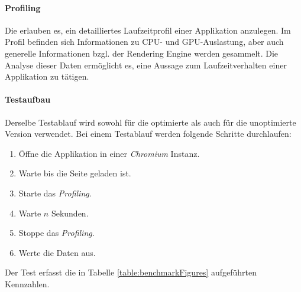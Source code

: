 \paragraph{Profiling}
Die  erlauben es, ein detailliertes Laufzeitprofil einer Applikation anzulegen.
Im Profil befinden sich Informationen zu CPU- und GPU-Auslastung, aber auch generelle Informationen bzgl. der \gls{Rendering Engine} werden gesammelt.
Die Analyse dieser Daten ermöglicht es, eine Aussage zum Laufzeitverhalten einer Applikation zu tätigen.

\paragraph{Testaufbau}
Derselbe Testablauf wird sowohl für die optimierte als auch für die unoptimierte Version verwendet.
Bei einem Testablauf werden folgende Schritte durchlaufen:

\begin{enumerate}
  \item Öffne die Applikation in einer \emph{Chromium} Instanz.
  \item Warte bis die Seite geladen ist.
  \item Starte das \emph{Profiling}.
  \item Warte $n$ Sekunden.
  \item Stoppe das \emph{Profiling}.
  \item Werte die Daten aus.
\end{enumerate}

Der Test erfasst die in Tabelle \ref{table:benchmarkFigures} aufgeführten Kennzahlen.

